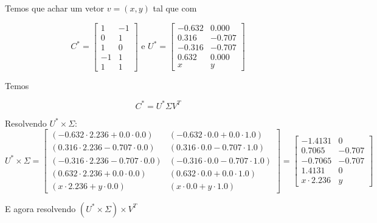 \documentclass[11pt]{article}
\begin{document}
\begin{exerc}
\begin{enumerate}
Temos que achar um vetor $v = (x, y)$ tal que com

\[
C^* = 
\begin{bmatrix}
    1 & -1 \\
    0 & 1 \\
    1 & 0 \\
    -1 & 1 \\
    1 & 1
\end{bmatrix}
\text{ e }
U^* = 
\begin{bmatrix}
    -0.632 & 0.000 \\
    0.316 & -0.707 \\
    -0.316 & -0.707 \\
    0.632 & 0.000 \\
    x & y
\end{bmatrix}
\]

Temos

$$C^* = U^* \Sigma V^T$$

Resolvendo $U^* \times \Sigma$:
\[
U^* \times \Sigma = 
\begin{bmatrix}
	(-0.632 \cdot 2.236 + 0.0 \cdot 0.0) & (-0.632 \cdot 0.0 + 0.0 \cdot 1.0) \\
	(0.316 \cdot 2.236 - 0.707 \cdot 0.0) & (0.316 \cdot 0.0 - 0.707 \cdot 1.0) \\
	(-0.316 \cdot 2.236 - 0.707 \cdot 0.0) & (-0.316 \cdot 0.0 - 0.707 \cdot 1.0) \\
	(0.632 \cdot 2.236 + 0.0 \cdot 0.0) & (0.632 \cdot 0.0 + 0.0 \cdot 1.0) \\
	(x \cdot 2.236 + y \cdot 0.0) & (x \cdot 0.0 + y \cdot 1.0)
\end{bmatrix}
=
\begin{bmatrix}
	-1.4131 & 0 \\
	0.7065 & -0.707 \\
	-0.7065 & -0.707 \\
	1.4131 & 0 \\
	x \cdot 2.236 & y
\end{bmatrix}
\]

E agora resolvendo $(U^* \times \Sigma) \times V^T$


\end{enumerate}
\end{exerc}
\end{document}
